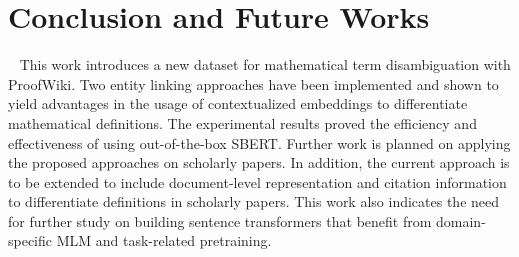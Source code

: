 \squeezeup
\section{Conclusion and Future Works}
~\label{sec:conclusion}
This work introduces a new dataset for %
mathematical term disambiguation with ProofWiki. Two entity linking approaches have been implemented and shown to yield advantages in the usage of contextualized embeddings to differentiate mathematical definitions. The experimental results proved the efficiency and effectiveness of using out-of-the-box SBERT. %
Further work is planned on applying the proposed approaches on scholarly papers. In addition, the current approach is to be extended to include document-level representation and citation information to differentiate definitions in scholarly papers. This work also indicates the need for further study on building sentence transformers that benefit from domain-specific MLM and task-related pretraining.

